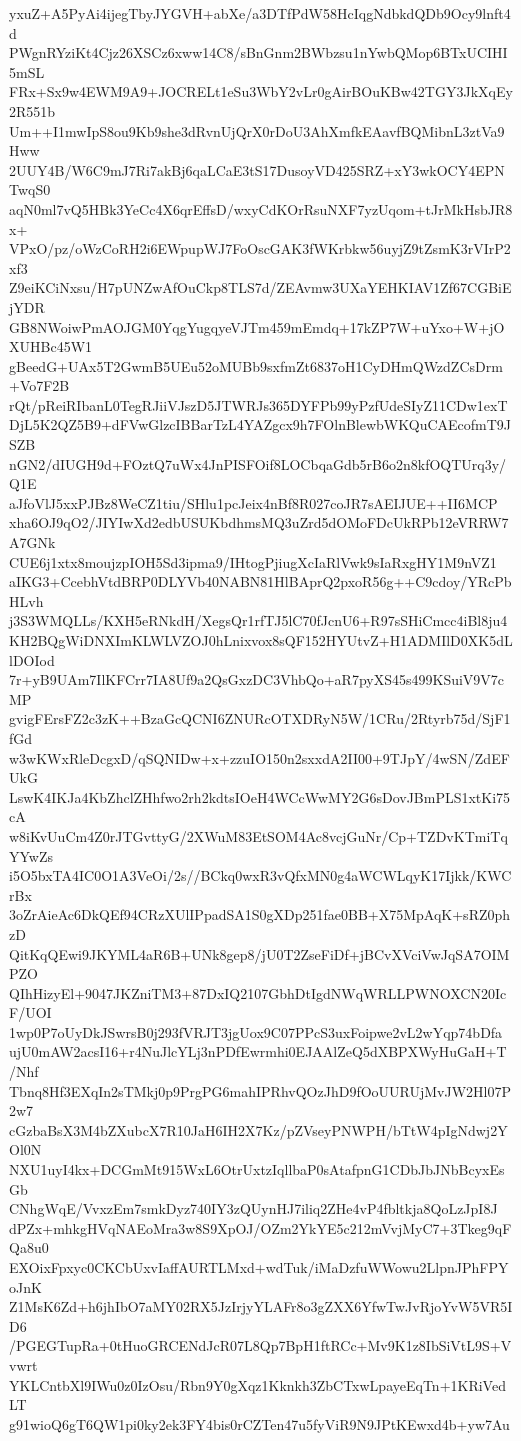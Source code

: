 yxuZ+A5PyAi4ijegTbyJYGVH+abXe/a3DTfPdW58HcIqgNdbkdQDb9Ocy9lnft4d
PWgnRYziKt4Cjz26XSCz6xww14C8/sBnGnm2BWbzsu1nYwbQMop6BTxUCIHI5mSL
FRx+Sx9w4EWM9A9+JOCRELt1eSu3WbY2vLr0gAirBOuKBw42TGY3JkXqEy2R551b
Um++I1mwIpS8ou9Kb9she3dRvnUjQrX0rDoU3AhXmfkEAavfBQMibnL3ztVa9Hww
2UUY4B/W6C9mJ7Ri7akBj6qaLCaE3tS17DusoyVD425SRZ+xY3wkOCY4EPNTwqS0
aqN0ml7vQ5HBk3YeCc4X6qrEffsD/wxyCdKOrRsuNXF7yzUqom+tJrMkHsbJR8x+
VPxO/pz/oWzCoRH2i6EWpupWJ7FoOscGAK3fWKrbkw56uyjZ9tZsmK3rVIrP2xf3
Z9eiKCiNxsu/H7pUNZwAfOuCkp8TLS7d/ZEAvmw3UXaYEHKIAV1Zf67CGBiEjYDR
GB8NWoiwPmAOJGM0YqgYugqyeVJTm459mEmdq+17kZP7W+uYxo+W+jOXUHBc45W1
gBeedG+UAx5T2GwmB5UEu52oMUBb9sxfmZt6837oH1CyDHmQWzdZCsDrm+Vo7F2B
rQt/pReiRIbanL0TegRJiiVJszD5JTWRJs365DYFPb99yPzfUdeSIyZ11CDw1exT
DjL5K2QZ5B9+dFVwGlzcIBBarTzL4YAZgcx9h7FOlnBlewbWKQuCAEcofmT9JSZB
nGN2/dIUGH9d+FOztQ7uWx4JnPISFOif8LOCbqaGdb5rB6o2n8kfOQTUrq3y/Q1E
aJfoVlJ5xxPJBz8WeCZ1tiu/SHlu1pcJeix4nBf8R027coJR7sAEIJUE++II6MCP
xha6OJ9qO2/JIYIwXd2edbUSUKbdhmsMQ3uZrd5dOMoFDcUkRPb12eVRRW7A7GNk
CUE6j1xtx8moujzpIOH5Sd3ipma9/IHtogPjiugXcIaRlVwk9sIaRxgHY1M9nVZ1
aIKG3+CcebhVtdBRP0DLYVb40NABN81HlBAprQ2pxoR56g++C9cdoy/YRcPbHLvh
j3S3WMQLLs/KXH5eRNkdH/XegsQr1rfTJ5lC70fJcnU6+R97sSHiCmcc4iBl8ju4
KH2BQgWiDNXImKLWLVZOJ0hLnixvox8sQF152HYUtvZ+H1ADMIlD0XK5dLlDOIod
7r+yB9UAm7IlKFCrr7IA8Uf9a2QsGxzDC3VhbQo+aR7pyXS45s499KSuiV9V7cMP
gvigFErsFZ2c3zK++BzaGcQCNI6ZNURcOTXDRyN5W/1CRu/2Rtyrb75d/SjF1fGd
w3wKWxRleDcgxD/qSQNIDw+x+zzuIO150n2sxxdA2II00+9TJpY/4wSN/ZdEFUkG
LswK4IKJa4KbZhclZHhfwo2rh2kdtsIOeH4WCcWwMY2G6sDovJBmPLS1xtKi75cA
w8iKvUuCm4Z0rJTGvttyG/2XWuM83EtSOM4Ac8vcjGuNr/Cp+TZDvKTmiTqYYwZs
i5O5bxTA4IC0O1A3VeOi/2s//BCkq0wxR3vQfxMN0g4aWCWLqyK17Ijkk/KWCrBx
3oZrAieAc6DkQEf94CRzXUlIPpadSA1S0gXDp251fae0BB+X75MpAqK+sRZ0phzD
QitKqQEwi9JKYML4aR6B+UNk8gep8/jU0T2ZseFiDf+jBCvXVciVwJqSA7OIMPZO
QIhHizyEl+9047JKZniTM3+87DxIQ2107GbhDtIgdNWqWRLLPWNOXCN20IcF/UOI
1wp0P7oUyDkJSwrsB0j293fVRJT3jgUox9C07PPcS3uxFoipwe2vL2wYqp74bDfa
ujU0mAW2acsI16+r4NuJlcYLj3nPDfEwrmhi0EJAAlZeQ5dXBPXWyHuGaH+T/Nhf
Tbnq8Hf3EXqIn2sTMkj0p9PrgPG6mahIPRhvQOzJhD9fOoUURUjMvJW2Hl07P2w7
cGzbaBsX3M4bZXubcX7R10JaH6IH2X7Kz/pZVseyPNWPH/bTtW4pIgNdwj2YOl0N
NXU1uyI4kx+DCGmMt915WxL6OtrUxtzIqllbaP0sAtafpnG1CDbJbJNbBcyxEsGb
CNhgWqE/VvxzEm7smkDyz740IY3zQUynHJ7iliq2ZHe4vP4fbltkja8QoLzJpI8J
dPZx+mhkgHVqNAEoMra3w8S9XpOJ/OZm2YkYE5c212mVvjMyC7+3Tkeg9qFQa8u0
EXOixFpxyc0CKCbUxvIaffAURTLMxd+wdTuk/iMaDzfuWWowu2LlpnJPhFPYoJnK
Z1MsK6Zd+h6jhIbO7aMY02RX5JzIrjyYLAFr8o3gZXX6YfwTwJvRjoYvW5VR5ID6
/PGEGTupRa+0tHuoGRCENdJcR07L8Qp7BpH1ftRCc+Mv9K1z8IbSiVtL9S+Vvwrt
YKLCntbXl9IWu0z0IzOsu/Rbn9Y0gXqz1Kknkh3ZbCTxwLpayeEqTn+1KRiVedLT
g91wioQ6gT6QW1pi0ky2ek3FY4bis0rCZTen47u5fyViR9N9JPtKEwxd4b+yw7Au
